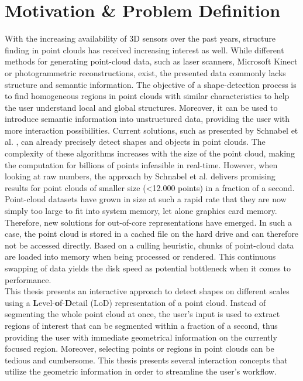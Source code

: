 \section{Motivation \& Problem Definition}

With the increasing availability of 3D sensors over the past years, structure finding in point clouds has received increasing interest as well. While different methods for generating point-cloud data, such as laser scanners, Microsoft Kinect or photogrammetric reconstructions, exist, the presented data commonly lacks structure and semantic information. The objective of a shape-detection process is to find homogeneous regions in point clouds with similar characteristics to help the user understand local and global structures. Moreover, it can be used to introduce semantic information into unstructured data, providing the user with more interaction possibilities. Current solutions, such as presented by Schnabel et al. \cite{schnabel-2007-efficient}\cite{schnabel-2007-ransac}, can already precisely detect shapes and objects in point clouds. The complexity of these algorithms increases with the size of the point cloud, making the computation for billions of points infeasible in real-time. However, when looking at raw numbers, the approach by Schnabel et al. \cite{schnabel-2007-ransac} delivers promising results for point clouds of smaller size (\textless 12.000 points) in a fraction of a second. 
\\
Point-cloud datasets have grown in size at such a rapid rate that they are now simply too large to fit into system memory, let alone graphics card memory. Therefore, new solutions for out-of-core representations have emerged. In such a case, the point cloud is stored in a cached file on the hard drive and can therefore not be accessed directly. Based on a culling heuristic, chunks of point-cloud data are loaded into memory when being processed or rendered. This continuous swapping of data yields the disk speed as potential bottleneck when it comes to performance.
\\
This thesis presents an interactive approach to detect shapes on different scales using a \textbf{L}evel-\textbf{o}f-\textbf{D}etail (LoD) representation of a point cloud. Instead of segmenting the whole point cloud at once, the user's input is used to extract regions of interest that can be segmented within a fraction of a second, thus providing the user with immediate geometrical information on the currently focused region. Moreover, selecting points or regions in point clouds can be tedious and cumbersome. This thesis presents several interaction concepts that utilize the geometric information in order to streamline the user's workflow. 